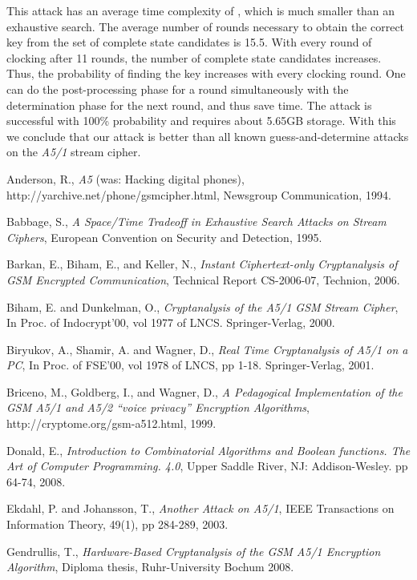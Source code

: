 \documentclass{llncs}
\begin{document}
This attack has an average time complexity of , which is much smaller than an exhaustive search. The average number of rounds necessary to obtain the correct key from the set of complete state candidates is 15.5. With every round of clocking after 11 rounds, the number of complete state candidates increases. Thus, the probability of finding the key increases with every clocking round. One can do the post-processing phase for a round simultaneously with the determination phase for the next round, and thus save time. The attack is successful with 100\% probability and requires about 5.65GB storage. With this we conclude that our attack is better than all known guess-and-determine attacks on the \emph{A5/1} stream cipher.
\begin{thebibliography}{Ref}
\bibitem{[And]} Anderson, R., {\it A5} (was: Hacking digital phones), http://yarchive.net/phone/gsmcipher.html, Newsgroup Communication, 1994.

\bibitem{[Bab]} Babbage, S., {\it A Space/Time Tradeoff in Exhaustive Search Attacks on Stream Ciphers}, European Convention on Security and Detection, 1995.

\bibitem{[Bar]} {Barkan, E., Biham, E., and Keller, N.}, \textit{Instant Ciphertext-only Cryptanalysis of GSM Encrypted Communication}, Technical Report CS-2006-07, Technion, 2006.

\bibitem{[BD]} {Biham, E. and Dunkelman, O.}, {\it Cryptanalysis of the A5/1 GSM Stream Cipher}, In Proc. of Indocrypt'00, vol 1977 of LNCS. Springer-Verlag, 2000.

\bibitem{[Bir]} {Biryukov, A., Shamir, A. and Wagner, D.}, {\it Real Time Cryptanalysis of A5/1 on a PC}, In Proc. of FSE'00, vol 1978 of LNCS, pp 1-18. Springer-Verlag, 2001.

\bibitem{[Bri]} {Briceno, M., Goldberg, I., and Wagner, D.}, {\it A Pedagogical Implementation of the GSM A5/1 and A5/2 ``voice privacy'' Encryption Algorithms}, http://cryptome.org/gsm-a512.html, 1999.

\bibitem{[Donald]} {Donald, E.}, {\it Introduction to  Combinatorial Algorithms and Boolean functions. The Art of Computer Programming. 4.0}, Upper Saddle River, NJ: Addison-Wesley. pp 64-74, 2008.

\bibitem{[Ek]} {Ekdahl, P. and Johansson, T.}, {\it Another Attack on A5/1}, IEEE Transactions on Information Theory, 49(1), pp 284-289, 2003. 

\bibitem{[Gend]} {Gendrullis, T.}, {\it Hardware-Based Cryptanalysis of the GSM A5/1 Encryption Algorithm}, Diploma thesis, Ruhr-University Bochum 2008.


\end{thebibliography}
\end{document}
